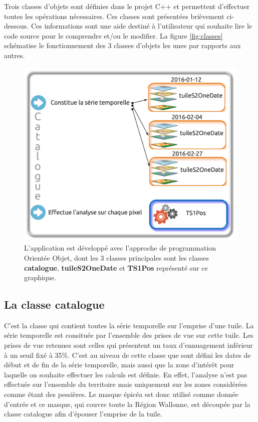 \documentclass[a4paper, 12pt]{article} %
\begin{document}
Trois classes d'objets sont définies dans le projet C++ et permettent d'effectuer toutes les opérations nécessaires. Ces classes sont présentées brièvement ci-dessous. Ces informations sont une aide destiné à l'utilisateur qui souhaite lire le code source pour le comprendre et/ou le modifier. La figure \ref{fig:classes} schématise le fonctionnement des 3 classes d'objets les unes par rapports aux autres.

\begin{figure}
	\centering
	\includegraphics[width=\linewidth]{illuAppliS2TS.png}
	\caption{L'application est développé avec l'approche de programmation Orientée Objet, dont les 3 classes principales sont les classes \textbf{catalogue}, \textbf{tuileS2OneDate} et \textbf{TS1Pos} représenté sur ce graphique.\textbf{}}
	\label{fig:ex}
\end{figure}




\subsection{La classe \textbf{catalogue}}

C'est la classe qui contient toutes la série temporelle sur l'emprise d'une tuile. La série temporelle est consituée par l'ensemble des prises de vue sur cette tuile. Les prises de vue retenues sont celles qui présentent un taux d'ennuagement inférieur à un seuil fixé à 35\%. C'est au niveau de cette classe que sont défini les dates de début et de fin de la série temporelle, mais aussi que la zone d'intérêt pour laquelle on souhaite effectuer les calculs est définie. En effet, l'analyse n'est pas effectuée sur l'ensemble du territoire mais uniquement sur les zones considérées comme étant des pessières. Le masque épicéa est donc utilisé comme donnée d'entrée et ce masque, qui couvre toute la Région Wallonne, est découpée par la classe catalogue afin d'épouser l'emprise de la tuile.
\end{document}
